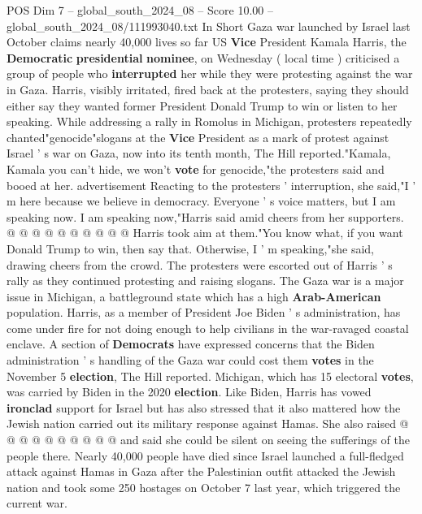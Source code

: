 \begin{textsample}{POS Dim 7 – global\_south\_2024\_08 – Score 10.00 – global\_south\_2024\_08/111993040.txt}  \label{ex:f7_pos_184}
In Short Gaza war launched by Israel last October claims nearly 40,000 lives so far US \textbf{Vice} President Kamala Harris, the \textbf{Democratic} \textbf{presidential} \textbf{nominee}, on Wednesday ( local time ) criticised a group of people who \textbf{interrupted} her while they were protesting against the war in Gaza.
Harris, visibly irritated, fired back at the protesters, saying they should either say they wanted former President Donald Trump to win or listen to her speaking.
While addressing a rally in Romolus in Michigan, protesters repeatedly chanted"genocide"slogans at the \textbf{Vice} President as a mark of protest against Israel ' s war on Gaza, now into its tenth month, The Hill reported."Kamala, Kamala you can't hide, we won't \textbf{vote} for genocide,"the protesters said and booed at her. advertisement Reacting to the protesters ' interruption, she said,"I ' m here because we believe in democracy.
Everyone ' s voice matters, but I am speaking now.
I am speaking now,"Harris said amid cheers from her supporters. @ @ @ @ @ @ @ @ @ @ Harris took aim at them."You know what, if you want Donald Trump to win, then say that.
Otherwise, I ' m speaking,"she said, drawing cheers from the crowd.
The protesters were escorted out of Harris ' s rally as they continued protesting and raising slogans.
The Gaza war is a major issue in Michigan, a battleground state which has a high \textbf{Arab-American} population.
Harris, as a member of President Joe Biden ' s administration, has come under fire for not doing enough to help civilians in the war-ravaged coastal enclave.
A section of \textbf{Democrats} have expressed concerns that the Biden administration ' s handling of the Gaza war could cost them \textbf{votes} in the November 5 \textbf{election}, The Hill reported.
Michigan, which has 15 electoral \textbf{votes}, was carried by Biden in the 2020 \textbf{election}.
Like Biden, Harris has vowed \textbf{ironclad} support for Israel but has also stressed that it also mattered how the Jewish nation carried out its military response against Hamas.
She also raised @ @ @ @ @ @ @ @ @ @ and said she could be silent on seeing the sufferings of the people there.
Nearly 40,000 people have died since Israel launched a full-fledged attack against Hamas in Gaza after the Palestinian outfit attacked the Jewish nation and took some 250 hostages on October 7 last year, which triggered the current war.

\end{textsample}
